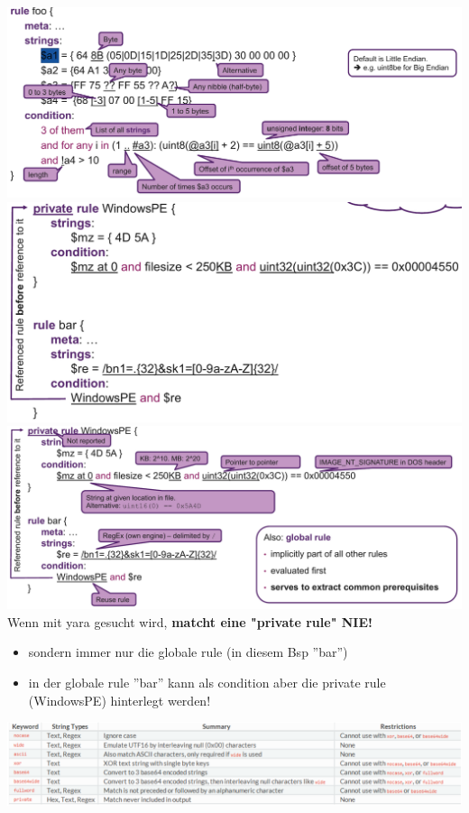 \includegraphics[width=\linewidth]{./img/12-yara/yara_rule_explained2.png}
\includegraphics[width=\linewidth]{./img/12-yara/yara_rule3.png}
\includegraphics[width=\linewidth]{./img/12-yara/yara_rule_explained3.png}
Wenn mit yara gesucht wird, \textbf{matcht eine "private rule" NIE!}
\begin{itemize}
    \item sondern immer nur die globale rule (in diesem Bsp ''bar'')
    \item in der globale rule ''bar'' kann als condition aber die private rule (WindowsPE) hinterlegt werden!\\
\end{itemize}
\includegraphics[width=\linewidth]{./img/12-yara/yara_string.png}


